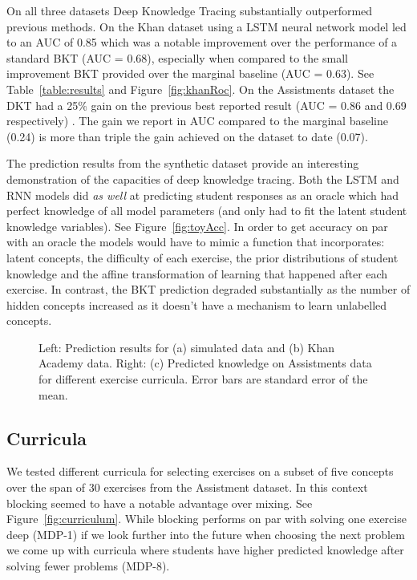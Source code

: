 \documentclass{article} \usepackage{nips,times}
\begin{document}
On all three datasets Deep Knowledge Tracing substantially outperformed previous methods. On the Khan dataset using a LSTM neural network model led to an AUC of 0.85 which was a notable improvement over the performance of a standard BKT (AUC = 0.68), especially when compared to the small improvement BKT provided over the marginal baseline (AUC = 0.63). See Table~\ref{table:results} and Figure~\ref{fig:khanRoc}. On the Assistments dataset the DKT had a 25\% gain on the previous best reported result (AUC = 0.86 and 0.69 respectively) \cite{pardos2011kt}. The gain we report in AUC compared to the marginal baseline (0.24) is more than triple the gain achieved on the dataset to date (0.07).

The prediction results from the synthetic dataset provide an interesting demonstration of the capacities of deep knowledge tracing. Both the LSTM and RNN models did \emph{as well} at predicting student responses as an oracle which had perfect knowledge of all model parameters (and only had to fit the latent student knowledge variables). See Figure~\ref{fig:toyAcc}. In order to get accuracy on par with an oracle the models would have to mimic a function that incorporates: latent concepts, the difficulty of each exercise, the prior distributions of student knowledge and the affine transformation of learning that happened after each exercise. In contrast, the BKT prediction degraded substantially as the number of hidden concepts increased as it doesn't have a mechanism to learn unlabelled concepts.




 \begin{figure*}[t]
 \centering
 \caption{Left: Prediction results for (a) simulated data and (b) Khan Academy data. Right: (c) Predicted knowledge on Assistments data for different exercise curricula. Error bars are standard error of the mean.}
 \vspace{-3mm}
 \end{figure*}

\subsection{ Curricula}\label{sec expectimax}

We tested different curricula for selecting exercises on a subset of five concepts over the span of 30 exercises from the Assistment dataset. In this context blocking seemed to have a notable advantage over mixing. See Figure~\ref{fig:curriculum}. While blocking performs on par with solving  one exercise deep (MDP-1) if we look further into the future when choosing the next problem we come up with curricula where students have higher predicted knowledge after solving fewer problems (MDP-8). 
\end{document}
